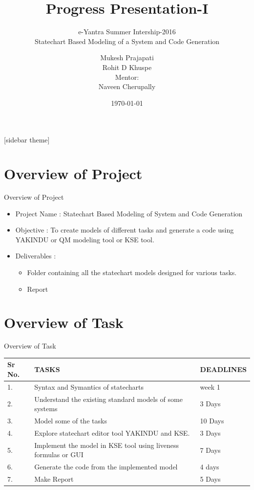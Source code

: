\documentclass[10pt, a4paper]{beamer}
\begin{document}
    \title{Progress Presentation-I}
    \subtitle{e-Yantra Summer Intership-2016 \\ Statechart Based Modeling of a System and Code Generation}
    \author{Mukesh Prajapati\\Rohit D Khuspe\\
    Mentor:\\ Naveen Cherupally}
    \date{\today}
    \frame{\titlepage}

[sidebar theme]
\section{Overview of Project}
\begin{frame}{Overview of Project}
    \begin{itemize}
        \item Project Name : Statechart Based Modeling of System and Code Generation 
        \item Objective : To create models of different tasks and generate a code using YAKINDU or QM modeling tool or KSE tool.
        \item Deliverables :
        \begin{itemize}
            \item  Folder containing all the  statechart models designed for various tasks.
            \item Report
        \end{itemize}
       
    \end{itemize}
\end{frame}

\section{Overview of Task}
\begin{frame}{Overview of Task}
    
\begin{center}
\begin{tabular}{ | m{.5cm} | m{5cm}| m{2cm} | } 
\hline
Sr No. & TASKS & DEADLINES \\ 
\hline
1. & Syntax and Symantics of statecharts & week 1  \\ 
\hline
2.& Understand the existing standard models of some systems & 3 Days\\ 
\hline
3. & Model some of the tasks & 10 Days  \\ 
\hline
4. & Explore statechart editor tool YAKINDU and KSE.  & 3 Days  \\ 
\hline
5. & Implement the model in KSE tool using liveness formulas or GUI  & 7 Days  \\ 
\hline
6. & Generate the code from the implemented model & 4 days  \\ 
\hline
7. & Make Report & 5 Days\\
\hline
\end{tabular}
\end{center}
\end{frame}
\end{document}
